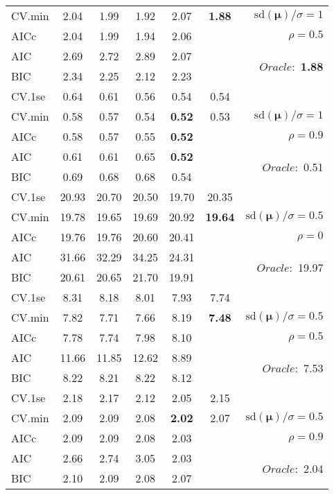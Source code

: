 \begin{table}
\begin{center}
\begin{tabular}{l*{5}{c}|r}
CV.min & 2.04 & 1.99 & 1.92 & 2.07 & {\bf 1.88} &  $\mathrm{sd}(\mathbf{\mu})/\sigma=1$ \\
AICc & 2.04 & 1.99 & 1.94 & 2.06 & & $\rho=0.5$ \\
AIC & 2.69 & 2.72 & 2.89 & 2.07 & &  \multirow{2}{*}{$Oracle: $ {\bf 1.88}} \\
BIC & 2.34 & 2.25 & 2.12 & 2.23 & &  \\
 \hline 
CV.1se & 0.64 & 0.61 & 0.56 & 0.54 & 0.54 & \\
CV.min & 0.58 & 0.57 & 0.54 & {\bf 0.52} & 0.53 &  $\mathrm{sd}(\mathbf{\mu})/\sigma=1$ \\
AICc & 0.58 & 0.57 & 0.55 & {\bf 0.52} & & $\rho=0.9$ \\
AIC & 0.61 & 0.61 & 0.65 & {\bf 0.52} & &  \multirow{2}{*}{$Oracle: $ 0.51} \\
BIC & 0.69 & 0.68 & 0.68 & 0.54 & &  \\
 \hline 
CV.1se & 20.93 & 20.70 & 20.50 & 19.70 & 20.35 & \\
CV.min & 19.78 & 19.65 & 19.69 & 20.92 & {\bf 19.64} &  $\mathrm{sd}(\mathbf{\mu})/\sigma=0.5$ \\
AICc & 19.76 & 19.76 & 20.60 & 20.41 & & $\rho=0$ \\
AIC & 31.66 & 32.29 & 34.25 & 24.31 & &  \multirow{2}{*}{$Oracle: $ 19.97} \\
BIC & 20.61 & 20.65 & 21.70 & 19.91 & &  \\
 \hline 
CV.1se & 8.31 & 8.18 & 8.01 & 7.93 & 7.74 & \\
CV.min & 7.82 & 7.71 & 7.66 & 8.19 & {\bf 7.48} &  $\mathrm{sd}(\mathbf{\mu})/\sigma=0.5$ \\
AICc & 7.78 & 7.74 & 7.98 & 8.10 & & $\rho=0.5$ \\
AIC & 11.66 & 11.85 & 12.62 & 8.89 & &  \multirow{2}{*}{$Oracle: $ 7.53} \\
BIC & 8.22 & 8.21 & 8.22 & 8.12 & &  \\
 \hline 
CV.1se & 2.18 & 2.17 & 2.12 & 2.05 & 2.15 & \\
CV.min & 2.09 & 2.09 & 2.08 & {\bf 2.02} & 2.07 &  $\mathrm{sd}(\mathbf{\mu})/\sigma=0.5$ \\
AICc & 2.09 & 2.09 & 2.08 & 2.03 & & $\rho=0.9$ \\
AIC & 2.66 & 2.74 & 3.05 & 2.03 & &  \multirow{2}{*}{$Oracle: $ 2.04} \\
BIC & 2.10 & 2.09 & 2.08 & 2.07 & &  \\
 \hline 
\end{tabular}
\end{center}
\vspace{-1cm}
\end{table}





